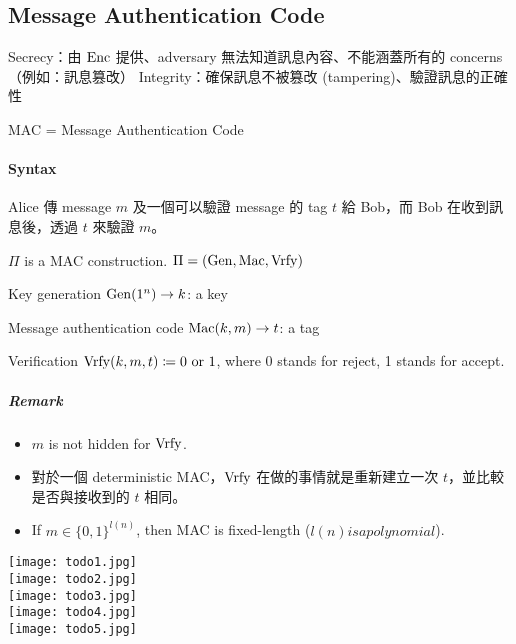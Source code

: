 \subsection{Message Authentication Code}

Secrecy：由 \(\operatorname{Enc}\) 提供、adversary 無法知道訊息內容、不能涵蓋所有的 concerns（例如：訊息篡改）
Integrity：確保訊息不被篡改 (tampering)、驗證訊息的正確性

MAC = Message Authentication Code


\paragraph{Syntax}

Alice 傳 message \(m\) 及一個可以驗證 message 的 tag \(t\) 給 Bob，而 Bob 在收到訊息後，透過 \(t\) 來驗證 \(m\)。

\(\Pi\) is a MAC construction.
\(\Pi = (\operatorname{Gen}, \operatorname{\mathrm{Mac}}, \operatorname{\mathrm{Vrfy}})\)
\begin{myItemize}
	\item Key generation \(\operatorname{Gen}(1^n) \rightarrow k\): a key
	\item Message authentication code \(\operatorname{\mathrm{Mac}}(k, m) \rightarrow t\): a tag
	\item Verification \(\operatorname{\mathrm{Vrfy}}(k, m, t) \coloneq 0 \text{ or } 1\), where 0 stands for reject, 1 stands for accept.
\end{myItemize}

\subparagraph{Remark}
\begin{itemize}
	\item \(m\) is not hidden for \(\operatorname{\mathrm{Vrfy}}\).
	\item 對於一個 deterministic MAC，\(\operatorname{\mathrm{Vrfy}}\) 在做的事情就是重新建立一次 \(t\)，並比較是否與接收到的 \(t\) 相同。
	\item If \(m \in \{0, 1\}^{l(n)}\), then MAC is fixed-length (\(l(n) is a polynomial\)).
\end{itemize}

\texttt{[image: todo1.jpg]} \\[0.25cm]
\texttt{[image: todo2.jpg]} \\[0.25cm]
\texttt{[image: todo3.jpg]} \\[0.25cm]
\texttt{[image: todo4.jpg]} \\[0.25cm]
\texttt{[image: todo5.jpg]}





